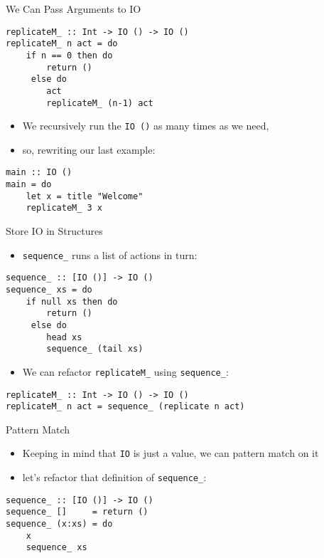 \documentclass{beamer}
\begin{document}
\begin{frame}[containsverbatim]{We Can Pass Arguments to IO}
\begin{lstlisting}
replicateM_ :: Int -> IO () -> IO ()
replicateM_ n act = do
    if n == 0 then do
        return ()
     else do
        act
        replicateM_ (n-1) act
\end{lstlisting}
\begin{itemize}
\item We recursively run the \lstinline{IO ()} as many times as we need,
\item so, rewriting our last example:
\end{itemize}
\begin{lstlisting}
main :: IO ()
main = do
    let x = title "Welcome"
    replicateM_ 3 x
\end{lstlisting}
\end{frame}

\begin{frame}[containsverbatim]{Store IO in Structures}
\begin{itemize}
\item \lstinline{sequence_} runs a list of actions in turn:
\end{itemize}
\begin{lstlisting}
sequence_ :: [IO ()] -> IO ()
sequence_ xs = do
    if null xs then do
        return ()
     else do
        head xs
        sequence_ (tail xs)
\end{lstlisting}
\begin{itemize}
\item We can refactor \lstinline{replicateM_} using \lstinline{sequence_}:
\end{itemize}
\begin{lstlisting}
replicateM_ :: Int -> IO () -> IO ()
replicateM_ n act = sequence_ (replicate n act)
\end{lstlisting}
\end{frame}

\begin{frame}[containsverbatim]{Pattern Match}
\begin{itemize}
\item Keeping in mind that \lstinline{IO} is just a value, we can pattern match on it
\item let's refactor that definition of \lstinline{sequence_}:
\end{itemize}
\begin{lstlisting}
sequence_ :: [IO ()] -> IO ()
sequence_ []     = return ()
sequence_ (x:xs) = do
    x
    sequence_ xs
\end{lstlisting}
\end{frame}
\end{document}
